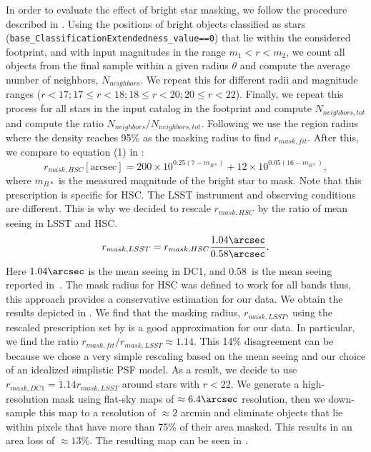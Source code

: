 \documentclass[\docopts]{\docclass}
\begin{document}
In order to evaluate the effect of bright star masking, we follow the procedure described in \citet{2018PASJ...70S...7C}. Using the positions of bright objects classified as stars (\texttt{base\_ClassificationExtendedness\_value==0}) that lie within the considered footprint, and with input magnitudes in the range $m_{1} < r < m_{2}$, we count all objects from the final sample within a given radius $\theta$ and compute the average number of neighbors, $N_{neighbors}$. We repeat this for different radii and magnitude ranges ($ r < 17; 17 \leq r < 18; 18 \leq r < 20; 20 \leq r < 22$). Finally, we repeat this process for all stars in the input catalog in the footprint and compute $N_{neighbors, tot}$ and compute the ratio $N_{neighbors}/N_{neighbors, tot}$. Following \citet{2018PASJ...70S...7C} we use the region radius where the density reaches 95\% as the masking radius to find $r_{mask,fit}$. After this, we compare to equation (1) in \citet{2018PASJ...70S..25M}:
\begin{equation}
r_{mask,HSC} [\mathrm{arcsec}]= 200\times 10^{0.25(7-m_{B*})} + 12 \times 10^{0.05(16-m_{B*})},
\end{equation}
where $m_{B*}$ is the measured magnitude of the bright star to mask. Note that this prescription is specific for HSC. The LSST instrument and observing conditions are different. This is why we decided to rescale $r_{mask,HSC}$ by the ratio of mean seeing in LSST and HSC.
\begin{equation}
r_{mask,LSST} = r_{mask,HSC} \frac{1.04\arcsec}{0.58\arcsec}.
\end{equation}
Here $1.04\arcsec$ is the mean seeing in DC1, and 0.58\arcsec~is the mean seeing reported in~\citet{2018PASJ...70S..25M}. The mask radius for HSC was defined to work for all bands thus, this approach provides a conservative estimation for our data. We obtain the results depicted in . We find that the masking radius, $r_{mask,LSST}$, using the rescaled prescription set by \citet{2018PASJ...70S..25M} is a good approximation for our data. In particular, we find the ratio $r_{mask,fit}/r_{mask,LSST} \approx 1.14$. This 14\% disagreement can be because we chose a very simple rescaling based on the mean seeing and our choice of an idealized simplistic PSF model. As a result, we decide to use $r_{mask, DC1} = 1.14 r_{mask, LSST}$ around stars with $r < 22$. We generate a high-resolution mask using flat-sky maps of $\approx 6.4 \arcsec$ resolution, then we down-sample this map to a resolution of $\approx 2$ arcmin and eliminate objects that lie within pixels that have more than 75\% of their area masked. This results in an area loss of $\approx 13\%$. The resulting map can be seen in . 
\end{document}
